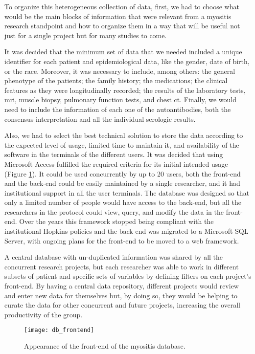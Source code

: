 To organize this heterogeneous collection of data, first, we had to choose what would be the main blocks of information that were relevant from a myositis research standpoint and how to organize them in a way that will be useful not just for a single project but for many studies to come.

It was decided that the minimum set of data that we needed included a unique identifier for each patient and epidemiological data, like the gender, date of birth, or the race. Moreover, it was necessary to include, among others: the general phenotype of the patients; the family history; the medications; the clinical features as they were longitudinally recorded; the results of the laboratory tests, \gls{mri}, muscle biopsy, pulmonary function tests, and chest \gls{ct}. Finally, we would need to include the information of each one of the autoantibodies, both the consensus interpretation and all the individual serologic results.

Also, we had to select the best technical solution to store the data according to the expected level of usage, limited time to maintain it, and availability of the software in the terminals of the different users. It was decided that using Microsoft Access fulfilled the required criteria for its initial intended usage (Figure \ref{fig:db_frontend}). It could be used concurrently by up to 20 users, both the front-end and the back-end could be easily maintained by a single researcher, and it had institutional support in all the user terminals. The database was designed so that only a limited number of people would have access to the back-end, but all the researchers in the protocol could view, query, and modify the data in the front-end. Over the years this framework stopped being compliant with the institutional Hopkins policies and the back-end was migrated to a Microsoft SQL Server, with ongoing plans for the front-end to be moved to a web framework.

A central database with un-duplicated information was shared by all the concurrent research projects, but each researcher was able to work in different subsets of patient and specific sets of variables by defining filters on each project's front-end. By having a central data repository, different projects would review and enter new data for themselves but, by doing so, they would be helping to curate the data for other concurrent and future projects, increasing the overall productivity of the group.

\begin{figure}
	\centering
	\texttt{[image: db\_frontend]}
	\caption{Appearance of the front-end of the myositis database.}
	\label{fig:db_frontend}
\end{figure}

